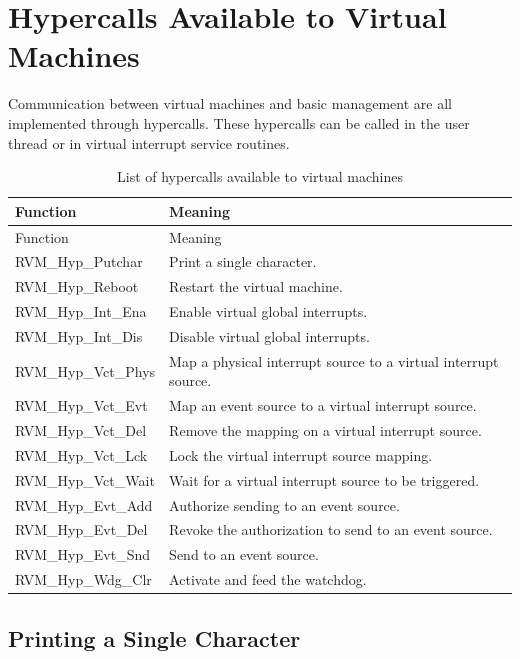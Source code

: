 \section{Hypercalls Available to Virtual Machines}\label{sec:4-4}

Communication between virtual machines and basic management are all implemented through hypercalls. These hypercalls can be called in the user thread or in virtual interrupt service routines.

\begin{xltabular}{\textwidth}{@{}>{\hsize\raggedright\arraybackslash}X>{\hsize\raggedright\arraybackslash}X@{}}
\caption{List of hypercalls available to virtual machines}\label{tab:4-4}\\
\toprule
Function & Meaning\tabularnewline
\endfirsthead
\toprule
Function & Meaning\tabularnewline
\midrule
\endhead
\bottomrule
\endlastfoot
RVM\_\allowbreak{}Hyp\_\allowbreak{}Putchar & Print a single character.\tabularnewline
RVM\_\allowbreak{}Hyp\_\allowbreak{}Reboot & Restart the virtual machine.\tabularnewline
RVM\_\allowbreak{}Hyp\_\allowbreak{}Int\_\allowbreak{}Ena & Enable virtual global interrupts.\tabularnewline
RVM\_\allowbreak{}Hyp\_\allowbreak{}Int\_\allowbreak{}Dis & Disable virtual global interrupts.\tabularnewline
RVM\_\allowbreak{}Hyp\_\allowbreak{}Vct\_\allowbreak{}Phys & Map a physical interrupt source to a virtual interrupt source.\tabularnewline
RVM\_\allowbreak{}Hyp\_\allowbreak{}Vct\_\allowbreak{}Evt & Map an event source to a virtual interrupt source.\tabularnewline
RVM\_\allowbreak{}Hyp\_\allowbreak{}Vct\_\allowbreak{}Del & Remove the mapping on a virtual interrupt source.\tabularnewline
RVM\_\allowbreak{}Hyp\_\allowbreak{}Vct\_\allowbreak{}Lck & Lock the virtual interrupt source mapping.\tabularnewline
RVM\_\allowbreak{}Hyp\_\allowbreak{}Vct\_\allowbreak{}Wait & Wait for a virtual interrupt source to be triggered.\tabularnewline
RVM\_\allowbreak{}Hyp\_\allowbreak{}Evt\_\allowbreak{}Add & Authorize sending to an event source.\tabularnewline
RVM\_\allowbreak{}Hyp\_\allowbreak{}Evt\_\allowbreak{}Del & Revoke the authorization to send to an event source.\tabularnewline
RVM\_\allowbreak{}Hyp\_\allowbreak{}Evt\_\allowbreak{}Snd & Send to an event source.\tabularnewline
RVM\_\allowbreak{}Hyp\_\allowbreak{}Wdg\_\allowbreak{}Clr & Activate and feed the watchdog.\tabularnewline
\end{xltabular}

\subsection{Printing a Single Character}\label{subsec:4-4-1}

